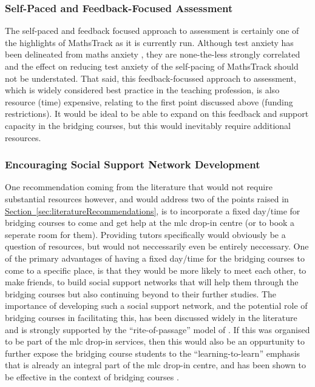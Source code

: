 \documentclass[twoside,12pt,a4paper]{report}
\newcommand{\refsec}[1]{\hyperref[sec:#1]{Section~\ref{sec:#1}}}
\begin{document}
\subsubsection{Self-Paced and Feedback-Focused Assessment}

The self-paced and feedback focused approach to assessment is certainly one of the highlights of MathsTrack as it is currently run. Although test anxiety has been delineated from maths anxiety \cite{Kazelskis2000}, they are none-the-less strongly correlated and the effect on reducing test anxiety of the self-pacing of MathsTrack should not be understated. That said, this feedback-focussed approach to assessment, which is widely considered best practice in the teaching profession, is also resource (time) expensive, relating to the first point discussed above (funding restrictions). It would be ideal to be able to expand on this feedback and support capacity in the bridging courses, but this would inevitably require additional resources.

\subsubsection{Encouraging Social Support Network Development}

One recommendation coming from the literature that would not require substantial resources however, and would address two of the points raised in \refsec{literatureRecommendations}, is to incorporate a fixed day/time for bridging courses to come and get help at the \gls{mlc} drop-in centre (or to book a seperate room for them). Providing tutors specifically would obviously be a question of resources, but would not neccessarily even be entirely neccessary. One of the primary advantages of having a fixed day/time for the bridging courses to come to a specific place, is that they would be more likely to meet each other, to make friends, to build social support networks that will help them through the bridging courses but also continuing beyond to their further studies. The importance of developing such a social support network, and the potential role of bridging courses in facilitating this, has been discussed widely in the literature \cite{Trotter2006, Peat2001, Leese2010, Gordon2013} and is strongly supported by the ``rite-of-passage'' model of . If this was organised to be part of the \gls{mlc} drop-in services, then this would also be an oppurtunity to further expose the bridging course students to the ``learning-to-learn'' emphasis that is already an integral part of the \gls{mlc} drop-in centre, and has been shown to be effective in the context of bridging courses \cite{Zeegers2001}.
\end{document}
